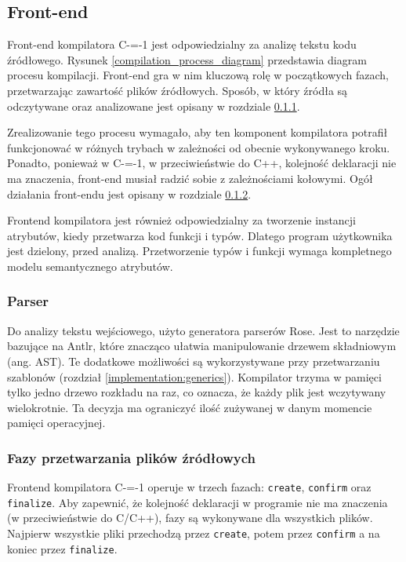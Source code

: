 \subsection{Front-end}
Front-end kompilatora C-=-1 jest odpowiedzialny za analizę tekstu kodu źródłowego. Rysunek \ref{compilation_process_diagram} przedstawia diagram procesu kompilacji.
Front-end gra w nim kluczową rolę w początkowych fazach, przetwarzając zawartość plików źródłowych.
Sposób, w który źródła są odczytywane oraz analizowane jest opisany w rozdziale \ref{implementation:parser}.

Zrealizowanie tego procesu wymagało, aby ten komponent kompilatora potrafił funkcjonować w różnych trybach w zależności od obecnie wykonywanego kroku.
Ponadto, ponieważ w C-=-1, w przeciwieństwie do C++, kolejność deklaracji nie ma znaczenia, front-end musiał radzić sobie z zależnościami kołowymi.
Ogół działania front-endu jest opisany w rozdziale \ref{implementation:source_processing_phases}.

Frontend kompilatora jest również odpowiedzialny za tworzenie instancji atrybutów, kiedy przetwarza kod funkcji i typów.
Dlatego program użytkownika jest dzielony, przed analizą.
Przetworzenie typów i funkcji wymaga kompletnego modelu semantycznego atrybutów.

\subsubsection{Parser}
\label{implementation:parser}
Do analizy tekstu wejściowego, użyto generatora parserów Rose\cite{grabski2020}.
Jest to narzędzie bazujące na Antlr, które znacząco ułatwia manipulowanie drzewem składniowym (ang. AST).
Te dodatkowe możliwości są wykorzystywane przy przetwarzaniu szablonów (rozdział \ref{implementation:generics}).
Kompilator trzyma w pamięci tylko jedno drzewo rozkładu na raz, co oznacza, że każdy plik jest wczytywany wielokrotnie.
Ta decyzja ma ograniczyć ilość zużywanej w danym momencie pamięci operacyjnej.

\subsubsection{Fazy przetwarzania plików źródłowych}
\label{implementation:source_processing_phases}

Frontend kompilatora C-=-1 operuje w trzech fazach: \lstinline{create}, \lstinline{confirm} oraz \lstinline{finalize}.
Aby zapewnić, że kolejność deklaracji w programie nie ma znaczenia (w przeciwieństwie do C/C++), fazy są wykonywane dla wszystkich plików.
Najpierw wszystkie pliki przechodzą przez \lstinline{create}, potem przez \lstinline{confirm} a na koniec przez \lstinline{finalize}.

